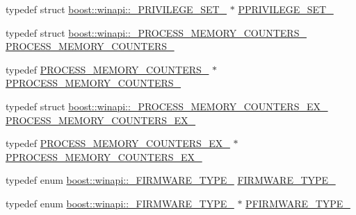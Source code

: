 \begin{DoxyCompactItemize}
\item 
typedef struct \mbox{\hyperlink{structboost_1_1winapi_1_1___p_r_i_v_i_l_e_g_e___s_e_t__}{boost\+::winapi\+::\+\_\+\+P\+R\+I\+V\+I\+L\+E\+G\+E\+\_\+\+S\+E\+T\+\_\+}} $\ast$ \mbox{\hyperlink{namespaceboost_1_1winapi_af28c625cdce2b0d35797ed9a52084610}{P\+P\+R\+I\+V\+I\+L\+E\+G\+E\+\_\+\+S\+E\+T\+\_\+}}
\item 
typedef struct \mbox{\hyperlink{structboost_1_1winapi_1_1___p_r_o_c_e_s_s___m_e_m_o_r_y___c_o_u_n_t_e_r_s__}{boost\+::winapi\+::\+\_\+\+P\+R\+O\+C\+E\+S\+S\+\_\+\+M\+E\+M\+O\+R\+Y\+\_\+\+C\+O\+U\+N\+T\+E\+R\+S\+\_\+}} \mbox{\hyperlink{namespaceboost_1_1winapi_a740f637968b4bb912627e78bf3c838a3}{P\+R\+O\+C\+E\+S\+S\+\_\+\+M\+E\+M\+O\+R\+Y\+\_\+\+C\+O\+U\+N\+T\+E\+R\+S\+\_\+}}
\item 
typedef \mbox{\hyperlink{namespaceboost_1_1winapi_a740f637968b4bb912627e78bf3c838a3}{P\+R\+O\+C\+E\+S\+S\+\_\+\+M\+E\+M\+O\+R\+Y\+\_\+\+C\+O\+U\+N\+T\+E\+R\+S\+\_\+}} $\ast$ \mbox{\hyperlink{namespaceboost_1_1winapi_a20b1ddfc1a2c59a32e579b39b2d28f9d}{P\+P\+R\+O\+C\+E\+S\+S\+\_\+\+M\+E\+M\+O\+R\+Y\+\_\+\+C\+O\+U\+N\+T\+E\+R\+S\+\_\+}}
\item 
typedef struct \mbox{\hyperlink{structboost_1_1winapi_1_1___p_r_o_c_e_s_s___m_e_m_o_r_y___c_o_u_n_t_e_r_s___e_x__}{boost\+::winapi\+::\+\_\+\+P\+R\+O\+C\+E\+S\+S\+\_\+\+M\+E\+M\+O\+R\+Y\+\_\+\+C\+O\+U\+N\+T\+E\+R\+S\+\_\+\+E\+X\+\_\+}} \mbox{\hyperlink{namespaceboost_1_1winapi_a59b056a4dc77c72b3bebced5be353f9b}{P\+R\+O\+C\+E\+S\+S\+\_\+\+M\+E\+M\+O\+R\+Y\+\_\+\+C\+O\+U\+N\+T\+E\+R\+S\+\_\+\+E\+X\+\_\+}}
\item 
typedef \mbox{\hyperlink{namespaceboost_1_1winapi_a59b056a4dc77c72b3bebced5be353f9b}{P\+R\+O\+C\+E\+S\+S\+\_\+\+M\+E\+M\+O\+R\+Y\+\_\+\+C\+O\+U\+N\+T\+E\+R\+S\+\_\+\+E\+X\+\_\+}} $\ast$ \mbox{\hyperlink{namespaceboost_1_1winapi_a26207e2007cd202ecf6a9624fac8ad4e}{P\+P\+R\+O\+C\+E\+S\+S\+\_\+\+M\+E\+M\+O\+R\+Y\+\_\+\+C\+O\+U\+N\+T\+E\+R\+S\+\_\+\+E\+X\+\_\+}}
\item 
typedef enum \mbox{\hyperlink{namespaceboost_1_1winapi_a95c858e6ecc52cd337e0e5e8ef33841d}{boost\+::winapi\+::\+\_\+\+F\+I\+R\+M\+W\+A\+R\+E\+\_\+\+T\+Y\+P\+E\+\_\+}} \mbox{\hyperlink{namespaceboost_1_1winapi_ab2bb3265a50b62bf9ddb48517baf2b10}{F\+I\+R\+M\+W\+A\+R\+E\+\_\+\+T\+Y\+P\+E\+\_\+}}
\item 
typedef enum \mbox{\hyperlink{namespaceboost_1_1winapi_a95c858e6ecc52cd337e0e5e8ef33841d}{boost\+::winapi\+::\+\_\+\+F\+I\+R\+M\+W\+A\+R\+E\+\_\+\+T\+Y\+P\+E\+\_\+}} $\ast$ \mbox{\hyperlink{namespaceboost_1_1winapi_a0eb084039f36dbf4e6208388b52d5929}{P\+F\+I\+R\+M\+W\+A\+R\+E\+\_\+\+T\+Y\+P\+E\+\_\+}}

\end{DoxyCompactItemize}
